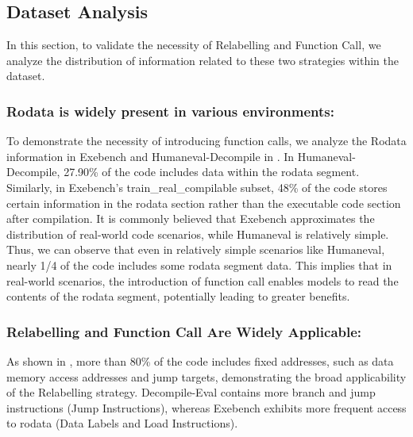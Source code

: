 


\subsection{Dataset Analysis}
In this section, to validate the necessity of Relabelling and Function Call, we analyze the distribution of information related to these two strategies within the dataset.


\subsubsection{Rodata is widely present in various environments:} 
To demonstrate the necessity of introducing function calls, we analyze the Rodata information in Exebench and Humaneval-Decompile in .
In Humaneval-Decompile, 27.90\% of the code includes data within the rodata segment.
Similarly, in Exebench's train\_real\_compilable subset, 48\% of the code stores certain information in the rodata section rather than the executable code section after compilation.
It is commonly believed that Exebench approximates the distribution of real-world code scenarios, while Humaneval is relatively simple. 
Thus, we can observe that even in relatively simple scenarios like Humaneval, nearly 1/4 of the code includes some rodata segment data. 
This implies that in real-world scenarios, the introduction of function call enables models to read the contents of the rodata segment, potentially leading to greater benefits.

\subsubsection{Relabelling and Function Call Are Widely Applicable:}

As shown in , more than 80\% of the code includes fixed addresses, such as data memory access addresses and jump targets, demonstrating the broad applicability of the Relabelling strategy. 
Decompile-Eval contains more branch and jump instructions (Jump Instructions), whereas Exebench exhibits more frequent access to rodata (Data Labels and Load Instructions).


